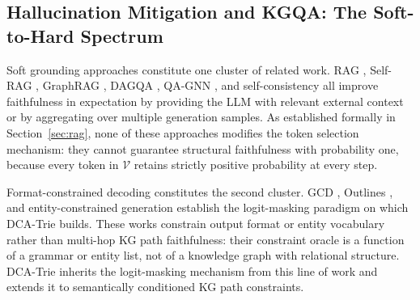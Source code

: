\begin{table}[H]
    \centering
    \caption{Primary related work comparison.}
    \label{tab:related_work}
    \small
\end{table}

\subsection{Hallucination Mitigation and KGQA: The Soft-to-Hard Spectrum}

Soft grounding approaches constitute one cluster of related work. RAG
\citep{lewis2020retrieval}, Self-RAG \citep{asai2024selfrag}, GraphRAG
\citep{edge2024graphrag}, DAGQA \citep{he2021multihop}, QA-GNN
\citep{yasunaga2021qagnn}, and self-consistency \citep{wang2023selfconsistency}
all improve faithfulness in expectation by providing the LLM with relevant
external context or by aggregating over multiple generation samples. As
established formally in Section~\ref{sec:rag}, none of these approaches modifies
the token selection mechanism: they cannot guarantee structural faithfulness with
probability one, because every token in $\mathcal{V}$ retains strictly positive
probability at every step.

Format-constrained decoding constitutes the second cluster. GCD \citep{geng2023gcd},
Outlines \citep{willard2023outlines}, and entity-constrained generation
\citep{decao2021autoregressive} establish the logit-masking paradigm on which
DCA-Trie builds. These works constrain output format or entity vocabulary rather
than multi-hop KG path faithfulness: their constraint oracle is a function of a
grammar or entity list, not of a knowledge graph with relational structure.
DCA-Trie inherits the logit-masking mechanism from this line of work and extends
it to semantically conditioned KG path constraints.

